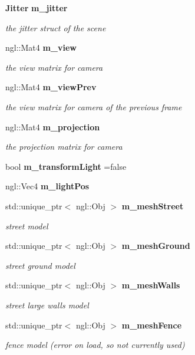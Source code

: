 \begin{DoxyCompactItemize}
\textbf{ Jitter} \textbf{ m\+\_\+jitter}
\begin{DoxyCompactList}\small\item\em the jitter struct of the scene \end{DoxyCompactList}\item 
ngl\+::\+Mat4 \textbf{ m\+\_\+view}
\begin{DoxyCompactList}\small\item\em the view matrix for camera \end{DoxyCompactList}\item 
ngl\+::\+Mat4 \textbf{ m\+\_\+view\+Prev}
\begin{DoxyCompactList}\small\item\em the view matrix for camera of the previous frame \end{DoxyCompactList}\item 
ngl\+::\+Mat4 \textbf{ m\+\_\+projection}
\begin{DoxyCompactList}\small\item\em the projection matrix for camera \end{DoxyCompactList}\item 
bool \textbf{ m\+\_\+transform\+Light} =false
\item 
ngl\+::\+Vec4 \textbf{ m\+\_\+light\+Pos}
\item 
std\+::unique\+\_\+ptr$<$ ngl\+::\+Obj $>$ \textbf{ m\+\_\+mesh\+Street}
\begin{DoxyCompactList}\small\item\em street model \end{DoxyCompactList}\item 
std\+::unique\+\_\+ptr$<$ ngl\+::\+Obj $>$ \textbf{ m\+\_\+mesh\+Ground}
\begin{DoxyCompactList}\small\item\em street ground model \end{DoxyCompactList}\item 
std\+::unique\+\_\+ptr$<$ ngl\+::\+Obj $>$ \textbf{ m\+\_\+mesh\+Walls}
\begin{DoxyCompactList}\small\item\em street large walls model \end{DoxyCompactList}\item 
std\+::unique\+\_\+ptr$<$ ngl\+::\+Obj $>$ \textbf{ m\+\_\+mesh\+Fence}
\begin{DoxyCompactList}\small\item\em fence model (error on load, so not currently used) \end{DoxyCompactList}\item 

\end{DoxyCompactItemize}
